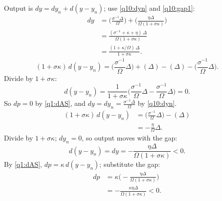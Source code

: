 \begin{sol}
Output is $dy=dy_n+d(y-y_n)$; use \eqref{q10:dyn} and \eqref{q10:gap1}:
\begin{align*}
dy&=\Big(\frac{\sigma^{-1}\Delta}{\Omega}\Big)+\Big(\frac{\eta\Delta}{\Omega(1+\sigma\kappa)}\Big)\\
&=\frac{(\sigma^{-1}+\kappa+\eta)\,\Delta}{\Omega(1+\sigma\kappa)}\\
&=\frac{(1+\kappa/\Omega)\,\Delta}{1+\sigma\kappa} .
\end{align*}
\begin{equation}
(1+\sigma\kappa)\,d(y-y_n)=\Big(\frac{\sigma^{-1}}{\Omega}\Delta\Big)+(\Delta)-(\Delta)-\Big(\frac{\sigma^{-1}}{\Omega}\Delta\Big) . \nonumber
\end{equation}
Divide by $1+\sigma\kappa$:
\begin{equation}
d(y-y_n)=\frac{1}{1+\sigma\kappa}\Big(\frac{\sigma^{-1}}{\Omega}\Delta-\frac{\sigma^{-1}}{\Omega}\Delta\Big)=0 . \nonumber
\end{equation}
So $dp=0$ by \eqref{q1:dAS}, and $dy=dy_n=\frac{\sigma^{-1}\Delta}{\Omega}$ by \eqref{q10:dyn}.
\begin{align}
(1+\sigma\kappa)\,d(y-y_n)&=\Big(\frac{\sigma^{-1}}{\Omega}\Delta\Big)-(\Delta)\nonumber\\
&=-\frac{\eta}{\Omega}\Delta . \nonumber
\end{align}
Divide by $1+\sigma\kappa$; $dy_n=0$, so output moves with the gap:
\begin{equation}
d(y-y_n)=dy=-\frac{\eta\Delta}{\Omega(1+\sigma\kappa)}<0 . \nonumber
\end{equation}
By \eqref{q1:dAS}, $dp=\kappa\,d(y-y_n)$; substitute the gap:
\begin{align}
dp&=\kappa\Big(-\frac{\eta\Delta}{\Omega(1+\sigma\kappa)}\Big)\nonumber\\
&=-\frac{\kappa\eta\Delta}{\Omega(1+\sigma\kappa)}<0 . \nonumber
\end{align}
\end{sol}

